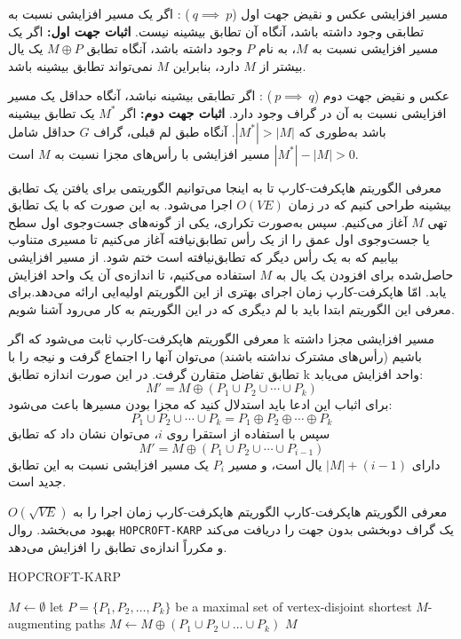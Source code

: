 \begin{itemframe}{مسیر افزایشی}
\itm
عکس و نقیض جهت اول
($~q\implies~p$)
: اگر یک مسیر افزایشی نسبت به تطابقی وجود داشته باشد، آنگاه آن تطابق بیشینه نیست.
\itm
\textbf{اثبات جهت اول:}
اگر یک مسیر افزایشی نسبت به $M$، به نام $P$ وجود داشته باشد، آنگاه تطابق $M \oplus P$ یک یال بیشتر از $M$ دارد، بنابراین $M$ نمی‌تواند تطابق بیشینه باشد.

\itm
عکس و نقیض جهت دوم
($‍~p \implies ~q$)
: اگر تطابقی بیشینه نباشد، آنگاه حداقل یک مسیر افزایشی نسبت به آن در گراف وجود دارد.
\itm
\textbf{اثبات جهت دوم:}
اگر $M^*$ یک تطابق بیشینه باشد به‌طوری که $|M^*| > |M|$. آنگاه طبق لم قبلی، گراف $G$ حداقل شامل
$|M^*| - |M| > 0$
 مسیر افزایشی با رأس‌های مجزا نسبت به $M$ است.
\end{itemframe}


\begin{itemframe}{‌معرفی الگوریتم هاپکرفت-کارپ}
\itm
تا به اینجا می‌توانیم الگوریتمی برای یافتن یک تطابق بیشینه طراحی کنیم که در زمان $O(VE)$ اجرا می‌شود.
\itm
به این صورت که با یک تطابق تهی $M$ آغاز می‌کنیم. سپس به‌صورت تکراری، یکی از گونه‌های جست‌وجوی اول سطح یا جست‌وجوی اول عمق را از یک رأس تطابق‌نیافته آغاز می‌کنیم تا مسیری متناوب بیابیم که به یک رأس دیگر که تطابق‌نیافته است ختم شود.
\itm
از مسیر افزایشی حاصل‌شده برای افزودن یک یال به $M$ استفاده می‌کنیم، تا اندازه‌ی آن یک واحد افزایش یابد.
\itm
امّا هاپکرفت-کارپ زمان اجرای بهتری از این الگوریتم اولیه‌ایی ارائه می‌دهد.برای معرفی این الگوریتم ابتدا باید با لم دیگری که در این الگوریتم به کار می‌رود آشنا شویم.
\end{itemframe}


\begin{itemframe}{‌معرفی الگوریتم هاپکرفت-کارپ}
\itm
ثابت می‌شود که اگر k مسیر افزایشی مجزا داشته باشیم (رأس‌های مشترک نداشته باشند) می‌توان آنها را اجتماع گرفت و نیجه را با تطابق تفاضل متقارن گرفت. در این صورت اندازه تطابق k واحد افزایش می‌یابد:
$$M' = M \oplus (P_1 \cup P_2 \cup \cdots \cup P_k)$$
\itm
برای اثباب این ادعا باید استدلال کنید که مجزا بودن مسیرها باعث می‌شود:
$$P_1 \cup P_2 \cup \cdots \cup P_k = P_1 \oplus P_2 \oplus \cdots \oplus P_k$$
سپس با استفاده از استقرا روی $i$، می‌توان نشان داد که تطابق
$$M' = M \oplus (P_1 \cup P_2 \cup \cdots \cup P_{i-1})$$
دارای $|M| + (i - 1)$ یال است، و مسیر $P_i$ یک مسیر افزایشی نسبت به این تطابق جدید است.
\end{itemframe}


\begin{itemframe}{‌معرفی الگوریتم هاپکرفت-کارپ}
\itm
الگوریتم هاپکرفت-کارپ زمان اجرا را به $O(\sqrt{V E})$ بهبود می‌بخشد. روال \texttt{HOPCROFT-KARP} یک گراف دوبخشی بدون جهت را دریافت می‌کند و مکرراً اندازه‌ی تطابق را افزایش می‌دهد.
\begin{algorithm}[H]\alglr
\caption{HOPCROFT-KARP}
\begin{algorithmic}[1]
	\State $M \gets \emptyset$
	\Repeat
        \State let $P = \{P_1, P_2, \ldots, P_k\}$ be a maximal set of vertex-disjoint shortest $M$-augmenting paths
		\State $M \gets M \oplus (P_1 \cup P_2 \cup \ldots \cup P_k)$
	\State \Return $M$
\end{algorithmic}
\end{algorithm}
\end{itemframe}


